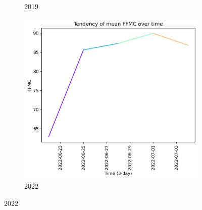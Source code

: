 \begin{figure}[h]
\begin{subfigure}{0.3\textwidth}
        \caption{2019}
        \label{fig:ffmc_prior_15_days_2019}
    \end{subfigure}
    \hfill
    \begin{subfigure}{0.3\textwidth}
        \centering
        \includegraphics[width=\textwidth]{graphs/2022/tendency/2022_tendency_graph_FFMC.png}
        \caption{2022}
        \label{fig:ffmc_prior_15_days_2022}
    \end{subfigure}
    
    \label{fig:ffmc_values_15days_prior}
\end{figure}

